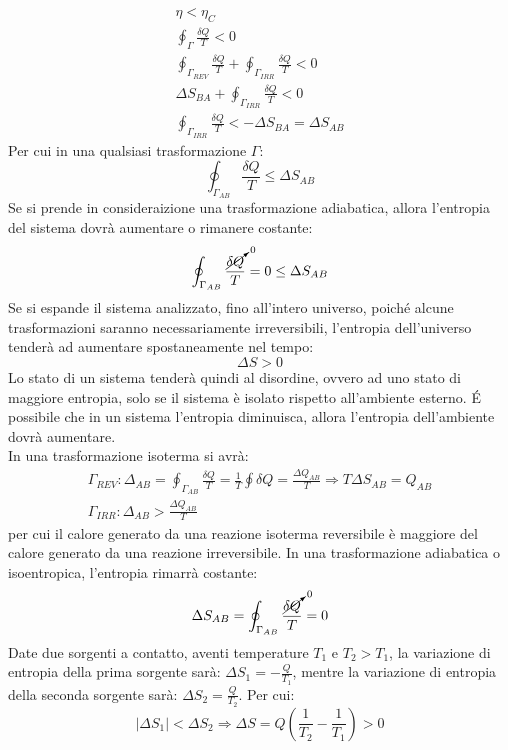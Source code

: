 \documentclass{article}
\numberwithin{equation}{subsection}
\begin{document}
\begin{gather}
    \eta<\eta_C\\
    \oint_{\Gamma}\displaystyle\frac{\delta Q}{T}<0\\
    \oint_{\Gamma_{REV}}\displaystyle\frac{\delta Q}{T}+\oint_{\Gamma_{IRR}}\frac{\delta Q}{T}<0\\
    \Delta S_{BA}+\displaystyle\oint_{\Gamma_{IRR}}\frac{\delta Q}{T}<0\\
    \displaystyle\oint_{\Gamma_{IRR}}\frac{\delta Q}{T}<-\Delta S_{BA}=\Delta S_{AB}
\end{gather}
Per cui in una qualsiasi trasformazione $\Gamma$:
\begin{equation}
    \displaystyle\oint_{\Gamma_{AB}}\frac{\delta Q}{T}\leq\Delta S_{AB}
\end{equation}
Se si prende in consideraizione una trasformazione adiabatica, allora l'entropia del sistema dovrà aumentare o rimanere costante:
\begin{equation}
    \displaystyle\oint_{\Gamma_{AB}}\frac{\cancelto{0}{\delta Q}}{T}=0\leq\Delta S_{AB}
\end{equation}
Se si espande il sistema analizzato, fino all'intero universo, poiché alcune trasformazioni saranno necessariamente irreversibili, l'entropia dell'universo tenderà 
ad aumentare spostaneamente nel tempo:
\begin{equation}
    \Delta S>0
\end{equation}
Lo stato di un sistema tenderà quindi al disordine, ovvero ad uno stato di maggiore entropia, solo se il sistema è isolato rispetto all'ambiente esterno. \'{E} possibile 
che in un sistema l'entropia diminuisca, allora l'entropia dell'ambiente dovrà aumentare. \\
In una trasformazione isoterma si avrà:
\begin{gather}
    \Gamma_{REV}:\Delta_{AB}=\displaystyle\oint_{\Gamma_{AB}}\frac{\delta Q}{T}=\frac{1}{T}\oint\delta Q=\frac{\Delta Q_{AB}}{T}\Rightarrow T\Delta S_{AB}=Q_{AB}\\
    \Gamma_{IRR}:\Delta_{AB}>\frac{\Delta Q_{AB}}{T}
\end{gather}
per cui il calore generato da una reazione isoterma reversibile è maggiore del calore generato da una reazione irreversibile. 
In una trasformazione adiabatica o isoentropica, l'entropia rimarrà costante:
\begin{equation}
    \Delta S_{AB}=\displaystyle\oint_{\Gamma_{AB}}\frac{\cancelto{0}{\delta Q}}{T}=0
\end{equation}
Date due sorgenti a contatto, aventi temperature $T_1$ e $T_2>T_1$, la variazione di entropia della prima sorgente sarà: $\Delta S_1=-\displaystyle\frac{Q}{T_1}$, mentre 
la variazione di entropia della seconda sorgente sarà: $\Delta S_2=\displaystyle\frac{Q}{T_2}$. Per cui:
\begin{equation}
    |\Delta S_1|<\Delta S_2\Rightarrow\Delta S=Q\left(\displaystyle\frac{1}{T_2}-\frac{1}{T_1}\right)>0
\end{equation}
\end{document}
